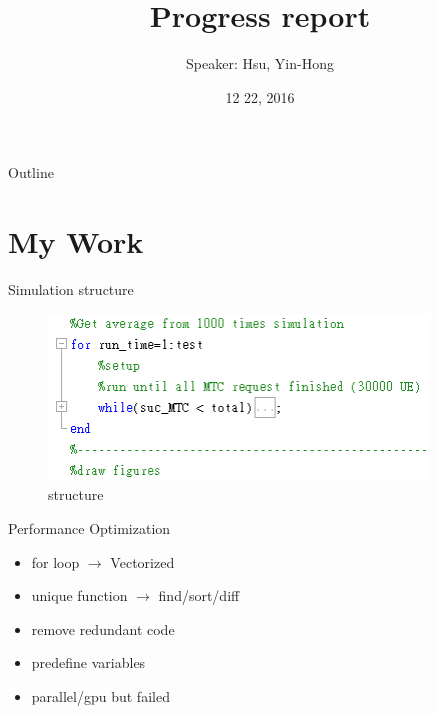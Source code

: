 \documentclass{beamer}
\title {
    Progress report
}
\author {
    Speaker: Hsu, Yin-Hong
}
\date {
    12 22, 2016 %
}
\begin{document}
\begin{frame}
    \titlepage
\end{frame}


\begin{frame}{Outline}
    \tableofcontentsgather
    \tableofcontents
\end{frame}

\section{My Work}

\begin{frame}{Simulation structure}
    \begin{figure}[t]
        \centering
        \includegraphics[width=0.9\textwidth]{figures/intro.png}
        \caption{structure}
    \end{figure}
\end{frame}

\begin{frame}{Performance Optimization}
    \begin{itemize}
        \item {for loop $\rightarrow$ Vectorized}
        \item {unique function $\rightarrow$ find/sort/diff}
        \item {remove redundant code}
        \item {predefine variables}
        \item {parallel/gpu but failed}
    \end{itemize}
\end{frame}
\end{document}

